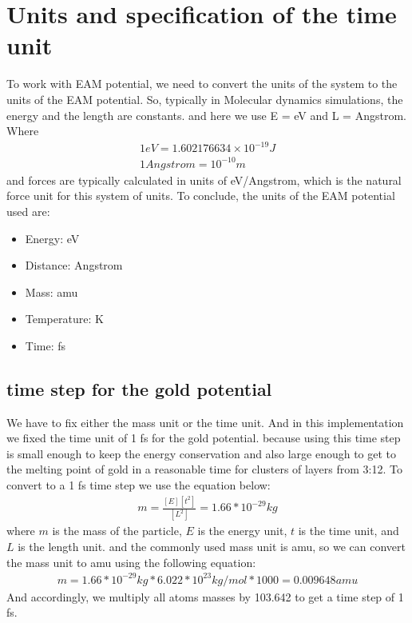 \section{Units and specification of the time unit}
    To work with EAM potential, we need to convert the units of the system to the units of the EAM potential. So, typically in Molecular dynamics simulations, the energy and the length are constants. and here we use E = eV and L = Angstrom. Where
    \begin{equation}
    \label{eq:units}
        \begin{aligned}
            1 eV = 1.602176634 \times 10^{-19} J \\
            1 Angstrom = 10^{-10} m
        \end{aligned}
    \end{equation}
    and forces are typically calculated in units of eV/Angstrom, which is the natural force unit for this system of units.
    To conclude, the units of the EAM potential used are:

    \begin{itemize}
        \item Energy: eV
        \item Distance: Angstrom
        \item Mass: amu
        \item Temperature: K
        \item Time: fs
    \end{itemize}

    \subsection{time step for the gold potential}
    We have to fix either the mass unit or the time unit. And in this implementation we fixed the time unit of 1 fs for the gold potential. because using this time step is small enough to keep the energy conservation and also large enough to get to the melting point of gold in a reasonable time for clusters of layers from 3:12. To convert to a 1 fs time step we use the equation below: 
    \begin{equation}
    \label{eq:time_step}
        \begin{aligned}
            m = \frac{[E][t^2]}{[L^2]} = 1.66*10^{-29} kg
        \end{aligned}
    \end{equation}
    where $m$ is the mass of the particle, $E$ is the energy unit, $t$ is the time unit, and $L$ is the length unit.
    and the commonly used mass unit is amu, so we can convert the mass unit to amu using the following equation:
    \begin{equation}
    \label{eq:amu}
        \begin{aligned}
            m = 1.66*10^{-29} kg * 6.022*10^{23} kg/mol * 1000 = 0.009648 amu
        \end{aligned}
    \end{equation}
    And accordingly, we multiply all atoms masses by 103.642 to get a time step of 1 fs.


